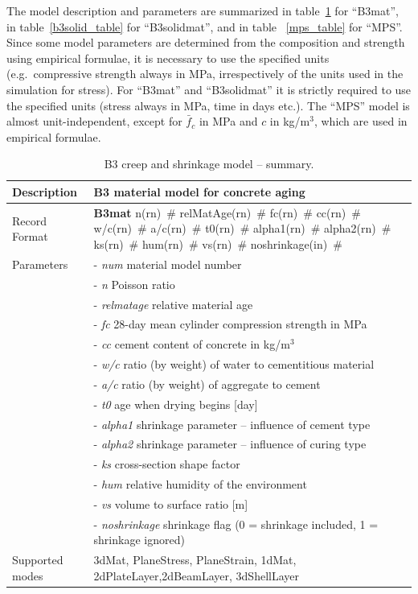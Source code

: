 \documentclass[a4paper]{article}
\newcommand{\descitem}[1]{{\noindent \bf #1}}
\newcommand{\elemparam}[2]{{{#1\tiny (#2)}~\#}}
\newcommand{\param}[1]{{\it #1}}
\begin{document}
The model description and parameters are summarized
in table~\ref{b3_table} for ``B3mat'', in table~\ref{b3solid_table} for ``B3solidmat'', and in table ~\ref{mps_table} for ``MPS''. 
Since some model parameters are determined from the composition
and strength using empirical formulae, it is necessary to use the
specified units (e.g.\ compressive strength always in MPa, irrespectively
of the units used in the simulation for stress). 
For ``B3mat'' and ``B3solidmat'' it is strictly 
required to use the specified units (stress always in MPa, time in days etc.). 
The ``MPS'' model is almost unit-independent, except for 
$\bar{f}_c$ in MPa and $c$ in kg/m$^3$, which are used in empirical formulae.

\begin{table}[!htb]
\begin{tabular}{|l|p{9cm}|}
\hline
Description & B3 material model  for concrete aging\\
\hline
Record Format & \descitem{B3mat}  \elemparam{n}{rn}
\elemparam{relMatAge}{rn} \elemparam{fc}{rn} \elemparam{cc}{rn} \elemparam{w/c}{rn}
\elemparam{a/c}{rn} \elemparam{t0}{rn}
\elemparam{alpha1}{rn} \elemparam{alpha2}{rn} \elemparam{ks}{rn}
\elemparam{hum}{rn} \elemparam{vs}{rn} \elemparam{noshrinkage}{in}\\
Parameters &- \param{num} material model number\\
&- \param{n} Poisson ratio\\
&- \param{relmatage} relative material age \\
&- \param{fc} 28-day mean cylinder compression strength in MPa\\
&- \param{cc} cement content of concrete  in kg/m$^{3}$ \\
&- \param{w/c} ratio (by weight) of water to cementitious material  \\
&- \param{a/c} ratio (by weight) of aggregate to cement \\
&- \param{t0} age when drying begins [day]\\
&- \param{alpha1} shrinkage parameter -- influence of cement type\\
&- \param{alpha2} shrinkage parameter -- influence of curing type\\
&- \param{ks} cross-section shape factor \\
&- \param{hum} relative humidity of the environment\\
&- \param{vs} volume to surface ratio [m]\\
&- \param{noshrinkage} shrinkage flag (0 = shrinkage included, 1 = shrinkage ignored)\\
Supported modes& 3dMat, PlaneStress, PlaneStrain, 1dMat,
2dPlateLayer,2dBeamLayer, 3dShellLayer\\
\hline
\end{tabular}
\caption{B3 creep and shrinkage model -- summary.}
\label{b3_table}
\end{table}
\end{document}
